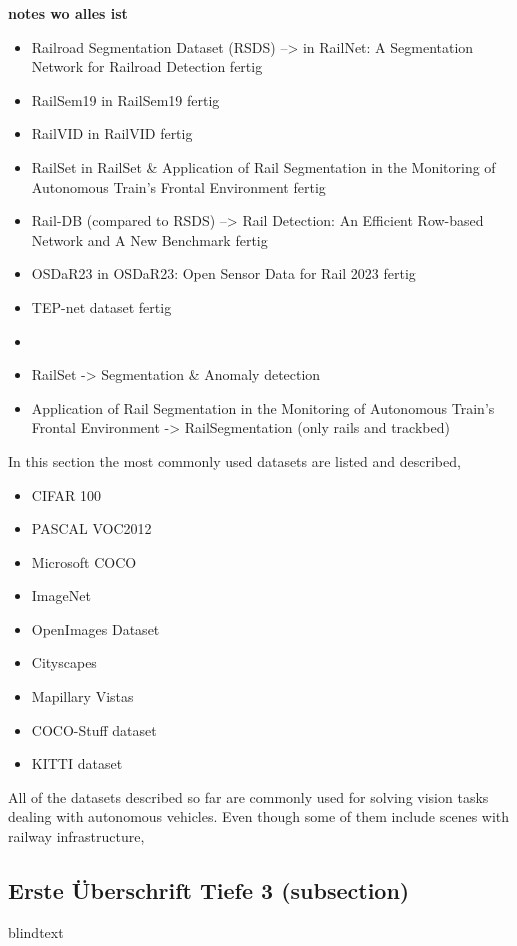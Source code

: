 \textbf{notes wo alles ist}

\begin{itemize}
    \item Railroad Segmentation Dataset (RSDS) --> in RailNet: A Segmentation Network for Railroad Detection fertig
    \item RailSem19 in RailSem19 fertig
    \item RailVID in RailVID fertig
    \item RailSet in RailSet \& Application of Rail Segmentation in the Monitoring of Autonomous Train’s Frontal Environment fertig
    \item Rail-DB (compared to RSDS) --> Rail Detection: An Efficient Row-based Network and A New Benchmark fertig
    \item OSDaR23 in OSDaR23: Open Sensor Data for Rail 2023 fertig
    \item TEP-net dataset fertig
    \item
    \item RailSet -> Segmentation \& Anomaly detection
    \item Application of Rail Segmentation in the Monitoring of Autonomous Train’s Frontal Environment -> RailSegmentation (only rails and trackbed)
\end{itemize}

In this section the most commonly used datasets are listed and described,

\begin{itemize}
    \item CIFAR 100
    \item PASCAL VOC2012
    \item Microsoft COCO
    \item ImageNet
    \item OpenImages Dataset
    \item Cityscapes
    \item Mapillary Vistas
    \item COCO-Stuff dataset
    \item KITTI dataset
\end{itemize}


All of the datasets described so far are commonly used for solving vision tasks dealing with autonomous vehicles. Even though some of them include scenes with railway infrastructure, 








\subsection{Erste Überschrift Tiefe 3 (subsection)}
blindtext


